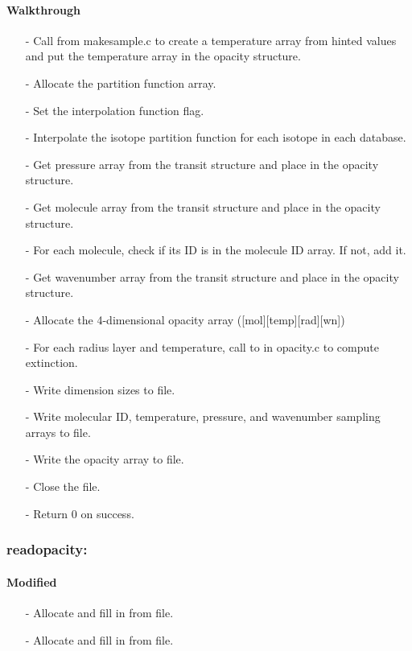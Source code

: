 \documentclass[letterpaper,12pt]{article}
\begin{document}
\paragraph{Walkthrough}
\begin{enumerate}[leftmargin=10pt, noitemsep, parsep=0pt, topsep=0ex]
\item[-] Call  from makesample.c to create a temperature array from hinted values and put the temperature array in the opacity structure.
\item[-] Allocate the partition function array.
\item[-] Set the interpolation function flag.
\item[-] Interpolate the isotope partition function for each isotope in each database.
\item[-] Get pressure array from the transit structure and place in the opacity structure.
\item[-] Get molecule array from the transit structure and place in the opacity structure.
\item[-] For each molecule, check if its ID is in the molecule ID array. If not, add it.
\item[-] Get wavenumber array from the transit structure and place in the opacity structure.
\item[-] Allocate the 4-dimensional opacity array ([mol][temp][rad][wn])
\item[-] For each radius layer and temperature, call to  in opacity.c to compute extinction.
\item[-] Write dimension sizes to file.
\item[-] Write molecular ID, temperature, pressure, and wavenumber sampling arrays to file.
\item[-] Write the opacity array to file.
\item[-] Close the file.
\item[-] Return 0 on success.
\end{enumerate}

\subsubsection{readopacity:}
\paragraph{Modified}
\begin{enumerate}[leftmargin=10pt, noitemsep, parsep=0pt, topsep=0ex]
\item[-] Allocate  and fill in from file.
\item[-] Allocate  and fill in from file.
\end{enumerate}
\end{document}
